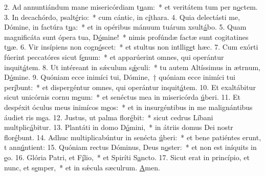 2. Ad annuntiándum mane misericórdiam t\uline{u}am:~* et veritátem tum per n\uline{o}ctem.
3. In decachórdo, psalt\uline{é}rio:~* cum cántic, in c\uline{í}thara.
4. Quia delectásti me, Dómine, in factúra t\uline{u}a:~* et in opéribus mánuum tuárum xsult\uline{á}bo.
5. Quam magnificáta sunt ópera tua, D\uline{ó}mine!~* nimis profúndæ factæ sunt cogitatines t\uline{u}æ.
6. Vir insípiens non cogn\uline{ó}scet:~* et stultus non intllig\uline{e}t hæc.
7. Cum exórti fúerint peccatóres sicut f\uline{e}num:~* et apparúerint omnes, qui operántur inquit\uline{á}tem.
8. Ut intéreant in sǽculum s\uline{ǽ}culi:~* tu autem Altíssimus in ætrnum, D\uline{ó}mine.
9. Quóniam ecce inimíci tui, Dómine,~† quóniam ecce inimíci tui per\uline{í}bunt:~* et dispergéntur omnes, qui operántur inquit\uline{á}tem.
10. Et exaltábitur sicut unicórnis cornu m\uline{e}um:~* et senéctus mea in misericórda \uline{ú}beri.
11. Et despéxit óculus meus inimícos m\uline{e}os:~* et in insurgéntibus in me malignántibus áudiet ris m\uline{e}a.
12. Justus, ut palma flor\uline{é}bit:~* sicut cedrus Líbani multplic\uline{á}bitur.
13. Plantáti in domo D\uline{ó}mini,~* in átriis domus Dei nostr flor\uline{é}bunt.
14. Adhuc multiplicabúntur in senécta \uline{ú}beri:~* et bene patiéntes erunt, t ann\uline{ú}ntient:
15. Quóniam rectus Dóminus, Deus n\uline{o}ster:~* et non est iníquits in \uline{e}o.
16. Glória Patri, et F\uline{í}lio,~* et Spiríti S\uline{a}ncto.
17. Sicut erat in princípio, et nunc, et s\uline{e}mper,~* et in sǽcula sæculrum. \uline{A}men.
